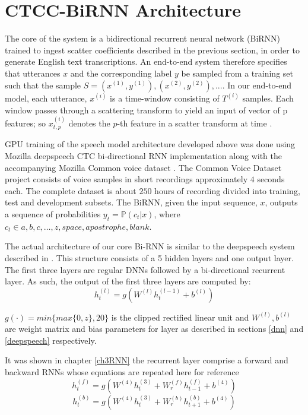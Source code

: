 \section{CTCC-BiRNN Architecture}
The core of the system is a bidirectional recurrent neural network (BiRNN) trained to ingest scatter coefficients described in the previous section, in order to generate English text transcriptions.  An end-to-end system therefore specifies that utterances $x$ and the corresponding label $y$ be sampled from a training set such that the sample $S = {(x^{(1)}, y^{(1)}), (x^{(2)}, y^{(2)}), . . .}$.   In our end-to-end model, each utterance, $x^{(i)}$ is a time-window consisting of $T^{(i)}$ samples.  Each window passes through a scattering transform to yield an input of vector of p features; so   $x^{(i)}_{t,p}$ denotes the $p$-th feature in a scatter transform at time .  

GPU training of the speech model architecture developed above was done using Mozilla deepspeech \cite{mozilla/deepspeech_2019} CTC bi-directional RNN implementation along with the accompanying Mozilla Common voice dataset  \cite{common voice by mozilla_2019}.  The Common Voice Dataset project consists of voice samples in short recordings approximately $4$ seconds each.  The complete dataset is about $250$ hours of recording divided into training, test and development subsets.  The BiRNN, given the input sequence, $x$, outputs a sequence of probabilities $y_t=\mathbb{P}(c_t|x)$,  where $c_t \in a,b,c,\dots,z,space,apostrophe,blank$. 

The actual architecture of our core Bi-RNN is similar to the deepspeech system described in \cite{hannun2014deep}. This structure consists of a 5 hidden layers and one output layer.  The first three layers are regular DNNs followed by a bi-directional recurrent layer. As such, the output of the first three layers are computed by:
\begin{equation}
    h^{(l)}_t = g(W^{(l)} h^{(l−1)}_t + b^{(l)})\label{ch06_01_l1-3}
\end{equation}

$g(\cdot) = min\{max\{0,z\},20\}$  is the clipped rectified linear unit and $W^{(l)},b^{(l)}$ are weight matrix and bias parameters for layer  as described in sections \ref{dnn} and \ref{deepspeech} respectively.

It was shown in chapter \ref{ch3RNN} the recurrent layer comprise a forward and backward RNNs whose equations are repeated here for reference
\begin{equation}
    h^{(f)}_t = g(W^{(4)} h^{(3)}_t + W^{(f)}_r h^{(f)}_{t−1} + b^{(4)})
    \label{ch06_02_fwd}
\end{equation}
\begin{equation}
h^{(b)}_t = g(W^{(4)} h^{(3)}_t + W^{(b)}_r h^{(b)}_{t+1} + b^{(4)})    \label{ch06_03_bwd}
\end{equation}

